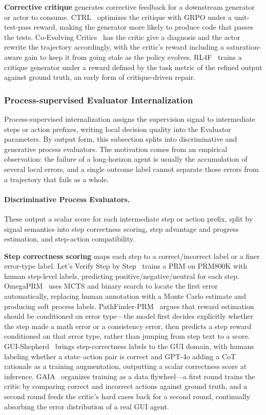 \textbf{Corrective critique} generates corrective feedback for a downstream generator or actor to consume. CTRL~\cite{Xie25c} optimizes the critique with GRPO under a unit-test-pass reward, making the generator more likely to produce code that passes the tests. Co-Evolving Critics~\cite{Li26l} has the critic give a diagnosis and the actor rewrite the trajectory accordingly, with the critic's reward including a saturation-aware gain to keep it from going stale as the policy evolves. RL4F~\cite{Aky23} trains a critique generator under a reward defined by the task metric of the refined output against ground truth, an early form of critique-driven repair.

\subsubsection{Process-supervised Evaluator Internalization}

Process-supervised internalization assigns the supervision signal to intermediate steps or action prefixes, writing local decision quality into the Evaluator parameters. By output form, this subsection splits into discriminative and generative process evaluators. The motivation comes from an empirical observation: the failure of a long-horizon agent is usually the accumulation of several local errors, and a single outcome label cannot separate those errors from a trajectory that fails as a whole.

\paragraph{Discriminative Process Evaluators.} These output a scalar score for each intermediate step or action prefix, split by signal semantics into step correctness scoring, step advantage and progress estimation, and step-action compatibility.

\textbf{Step correctness scoring} maps each step to a correct/incorrect label or a finer error-type label. Let's Verify Step by Step~\cite{Lig23} trains a PRM on PRM800K with human step-level labels, predicting positive/negative/neutral for each step. OmegaPRM~\cite{Luo24} uses MCTS and binary search to locate the first error automatically, replacing human annotation with a Monte Carlo estimate and producing soft process labels. PathFinder-PRM~\cite{Pal25} argues that reward estimation should be conditioned on error type---the model first decides explicitly whether the step made a math error or a consistency error, then predicts a step reward conditioned on that error type, rather than jumping from step text to a score. GUI-Shepherd~\cite{Che25h} brings step-correctness labels to the GUI domain, with humans labeling whether a state--action pair is correct and GPT-4o adding a CoT rationale as a training augmentation, outputting a scalar correctness score at inference. GAIA~\cite{Wan26p} organizes training as a data flywheel---a first round trains the critic by comparing correct and incorrect actions against ground truth, and a second round feeds the critic's hard cases back for a second round, continually absorbing the error distribution of a real GUI agent.

